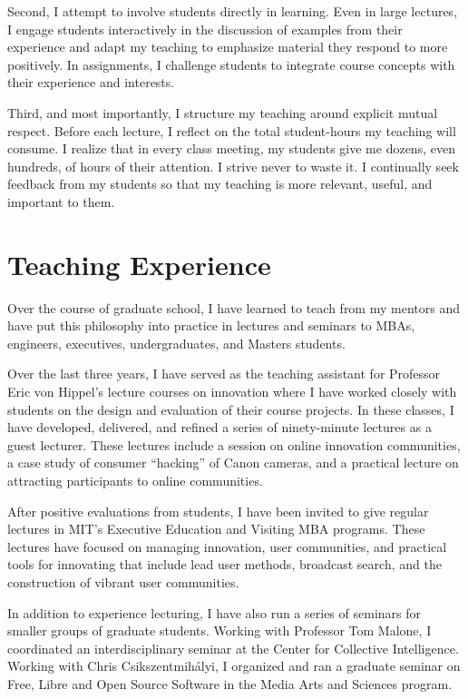 \documentclass[10pt]{memoir}
\begin{document}
Second, I attempt to involve students directly in learning. Even in
large lectures, I engage students interactively in the discussion of
examples from their experience and adapt my teaching to emphasize
material they respond to more positively. In assignments, I challenge
students to integrate course concepts with their experience and
interests.

Third, and most importantly, I structure my teaching around
explicit mutual respect. Before each lecture, I reflect on the total
student-hours my teaching will consume. I realize that in every class
meeting, my students give me dozens, even hundreds, of hours of their
attention. I strive never to waste it. I continually seek feedback
from my students so that my teaching is more relevant, useful, and
important to them.

\section{Teaching Experience}

Over the course of graduate school, I have learned to teach from my
mentors and have put this philosophy into practice in lectures and
seminars to MBAs, engineers, executives, undergraduates, and Masters
students.

Over the last three years, I have served as the teaching assistant for
Professor Eric von Hippel's lecture courses on innovation where I have
worked closely with students on the design and evaluation of their
course projects. In these classes, I have developed, delivered, and
refined a series of ninety-minute lectures as a guest lecturer. These
lectures include a session on online innovation communities, a case
study of consumer ``hacking'' of Canon cameras, and a practical
lecture on attracting participants to online communities.

After positive evaluations from students, I have been invited to give
regular lectures in MIT's Executive Education and Visiting MBA
programs. These lectures have focused on managing innovation, user
communities, and practical tools for innovating that include lead user
methods, broadcast search, and the construction of vibrant user
communities.

In addition to experience lecturing, I have also run a series of
seminars for smaller groups of graduate students. Working with
Professor Tom Malone, I coordinated an interdisciplinary seminar at
the Center for Collective Intelligence. Working with Chris
Csikszentmihályi, I organized and ran a graduate seminar on Free,
Libre and Open Source Software in the Media Arts and Sciences program.
\end{document}
